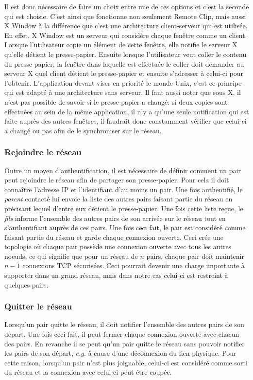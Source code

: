 Il est donc nécessaire de faire un choix entre une de ces options
et c'est la seconde qui est choisie. C'est ainsi que fonctionne non seulement
Remote Clip, mais aussi X Window\cite{nye1992xlib} à la différence
que c'est une architecture client-serveur qui est utilisée. En effet, X Window
est un serveur qui considère chaque fenêtre comme un client. Lorsque
l'utilisateur copie un élément de cette fenêtre, elle notifie le serveur X
qu'elle détient le presse-papier. Ensuite lorsque l'utilisateur
veut coller le contenu du presse-papier, la fenêtre dans laquelle est
effectuée le coller doit demander au serveur X quel client détient le
presse-papier et ensuite s'adresser à celui-ci pour l'obtenir. L'application
devant viser en priorité le monde Unix, c'est ce principe qui est adapté à
une architecture sans serveur. Il faut aussi noter que sous X, il n'est pas
possible de savoir si le presse-papier a changé: si deux copies sont
effectuées au sein de la même application, il n'y a qu'une seule notification
qui est faite auprès des autres fenêtres, il faudrait donc constamment
vérifier que celui-ci a changé ou pas afin de le synchroniser sur le
réseau.

\subsubsection*{Rejoindre le réseau}
Outre un moyen d'authentification, il est nécessaire de définir comment
un pair peut rejoindre le réseau afin de partager son presse-papier.
Pour cela il doit connaître l'adresse IP et l'identifiant d'au moins un pair.
Une fois authentifié, le \emph{parent} contacté lui envoie la liste
des autres pairs faisant partie du réseau en précisant lequel d'entre eux
détient le presse-papier. Une fois cette liste reçue, le \emph{fils}
informe l'ensemble des autres pairs de son arrivée sur le réseau tout en
s'authentifiant auprès de ces pairs. Une fois ceci fait, le pair est considéré
comme faisant partie du réseau et garde chaque connexion ouverte.
Ceci crée une topologie où chaque pair possède une connexion ouverte
avec tous les autres noeuds, ce qui signifie que pour un réseau de $n$
pairs, chaque pair doit maintenir $n-1$ connexions TCP sécurisées. Ceci
pourrait devenir une charge importante à supporter dans un grand réseau, mais
dans notre cas celui-ci est restreint à quelques pairs.

\subsubsection*{Quitter le réseau}
Lorsqu'un pair quitte le réseau, il doit notifier l'ensemble des autres
pairs de son départ. Une fois ceci fait, il peut fermer chaque connexion
ouverte avec chacun des pairs. En revanche il se peut qu'un pair quitte
le réseau sans pouvoir notifier les pairs de son départ, \emph{e.g.}
à cause d'une déconnexion du lien physique. Pour cette raison, lorsqu'un
pair n'est plus joignable, celui-ci est considéré comme sorti du réseau
et la connexion avec celui-ci peut être coupée.

